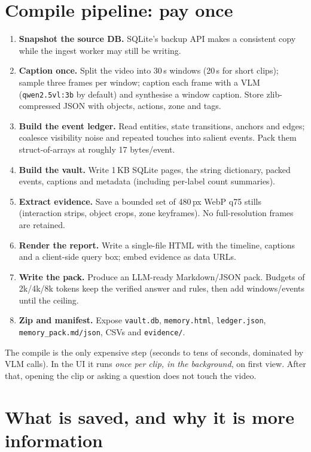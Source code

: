 \documentclass[10pt,a4paper]{article}
\newcommand{\code}[1]{\texttt{\small #1}}
\begin{document}
\section{Compile pipeline: pay once}

\begin{enumerate}[leftmargin=1.25em,itemsep=1pt]
  \item \textbf{Snapshot the source DB.} SQLite's backup API makes a consistent copy while the
        ingest worker may still be writing.
  \item \textbf{Caption once.} Split the video into 30\,s windows (20\,s for short clips); sample
        three frames per window; caption each frame with a VLM (\code{qwen2.5vl:3b} by default) and
        synthesise a window caption. Store zlib-compressed JSON with objects, actions, zone and tags.
  \item \textbf{Build the event ledger.} Read entities, state transitions, anchors and edges;
        coalesce visibility noise and repeated touches into salient events. Pack them
        struct-of-arrays at roughly 17 bytes/event.
  \item \textbf{Build the vault.} Write 1\,KB SQLite pages, the string dictionary, packed events,
        captions and metadata (including per-label count summaries).
  \item \textbf{Extract evidence.} Save a bounded set of 480\,px WebP q75 stills (interaction strips,
        object crops, zone keyframes). No full-resolution frames are retained.
  \item \textbf{Render the report.} Write a single-file HTML with the timeline, captions and a
        client-side query box; embed evidence as data URLs.
  \item \textbf{Write the pack.} Produce an LLM-ready Markdown/JSON pack. Budgets of 2k/4k/8k
        tokens keep the verified answer and rules, then add windows/events until the ceiling.
  \item \textbf{Zip and manifest.} Expose \code{vault.db}, \code{memory.html}, \code{ledger.json},
        \code{memory\_pack.md/json}, CSVs and \code{evidence/}.
\end{enumerate}

\noindent
The compile is the only expensive step (seconds to tens of seconds, dominated by VLM calls). In the
UI it runs \emph{once per clip, in the background}, on first view. After that, opening the clip or
asking a question does not touch the video.

\section{What is saved, and why it is more information}
\end{document}
